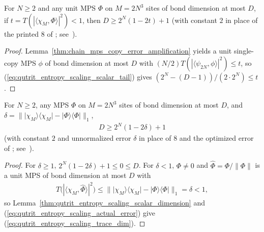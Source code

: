 \begin{lemma}
    \label{thm:qutrit_entropy_scaling_scalar_dimension}
    \leanok
    For $N\ge2$ and any unit MPS $\Phi$ on $M=2N^3$ sites of bond dimension at
    most $D$, if $t=T(|\langle\chi_M,\Phi\rangle|^2)<1$, then
    $D\ge2^N(1-2t)+1$ (with constant $2$ in place of the printed $8$ of
    \cite[lines 475--479]{Schuch2008EntropyScaling};
    see~\cite{gap:swvc08_qutrit_copy_constant}).
\end{lemma}
\begin{proof}\leanok
    Lemma~\ref{thm:chain_mps_copy_error_amplification} yields a unit
    single-copy MPS $\phi$ of bond dimension at most $D$ with
    $(N/2)T(|\langle\psi_{2N},\phi\rangle|^2)\le t$, so
    (\ref{eq:qutrit_entropy_scaling_scalar_tail}) gives
    $(2^N-(D-1))/(2\cdot2^N)\le t$.
\end{proof}

\begin{lemma}
    \label{thm:qutrit_entropy_scaling_trace_dimension}
    \leanok
    For $N\ge2$, any MPS $\Phi$ on $M=2N^3$ sites of bond dimension at most
    $D$, and $\delta=\|\lvert\chi_M\rangle\langle\chi_M\rvert-\lvert\Phi\rangle\langle\Phi\rvert\|_1$,
    \begin{align}
        D\ge2^N(1-2\delta)+1
        \label{eq:qutrit_entropy_scaling_trace_dim}
    \end{align}
    (with constant $2$ and unnormalized error $\delta$ in place of $8$ and the
    optimized error of \cite[lines 475--479]{Schuch2008EntropyScaling};
    see~\cite{gap:swvc08_qutrit_copy_constant}).
\end{lemma}
\begin{proof}\leanok
    For $\delta\ge1$, $2^N(1-2\delta)+1\le0\le D$. For $\delta<1$, $\Phi\ne0$
    and $\widehat\Phi=\Phi/\|\Phi\|$ is a unit MPS of bond dimension at most $D$
    with
    \begin{align}
        \label{eq:qutrit_entropy_scaling_actual_error}
        T\bigl(|\langle\chi_M,\widehat\Phi\rangle|^2\bigr)
        \le\bigl\|\lvert\chi_M\rangle\langle\chi_M\rvert-
        \lvert\Phi\rangle\langle\Phi\rvert\bigr\|_1=\delta<1,
    \end{align}
    so Lemma~\ref{thm:qutrit_entropy_scaling_scalar_dimension} and
    (\ref{eq:qutrit_entropy_scaling_actual_error}) give
    (\ref{eq:qutrit_entropy_scaling_trace_dim}).
\end{proof}

